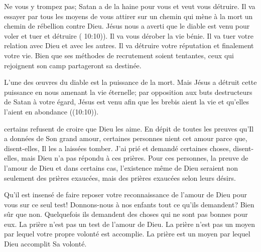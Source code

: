 
Ne vous y trompez pas; Satan a de la haine pour vous et veut vous détruire.
 Il va essayer par tous les moyens de vous attirer sur un chemin
 qui mène à la mort \ocadr un chemin de rébellion contre Dieu.
 Jésus nous a averti que le diable est venu pour
 \og voler et tuer et détruire \fg{} ( 10:10)).
 Il va vous dérober la vie bénie. Il va tuer votre relation avec Dieu
 et avec les autres. Il va détruire votre réputation et finalement votre vie.
 Bien que ses méthodes de recrutement soient tentantes,
 ceux qui rejoignent son camp partageront sa destinée. 

L'une des œuvres du diable est la puissance de la mort.
 Mais Jésus a détruit cette puissance en nous amenant la vie éternelle; 
 par opposition aux buts destructeurs de Satan à votre égard,
 Jésus est venu \og afin que les brebis aient la vie
 et qu'elles l'aient en abondance \fg{} ((10:10)). 

\dvrule






 certains refusent de croire que Dieu les aime.
 En dépit de toutes les preuves qu'Il a données de Son grand amour,
 certaines personnes nient cet amour parce que, disent-elles,
 Il les a laissées tomber.
 \og J'ai prié et demandé certaines choses, disent-elles, 
 mais Dieu n'a pas répondu à ces prières. \fg{}
 Pour ces personnes, la preuve de l'amour de Dieu
 \ocadr et dans certains cas, l'existence même de Dieu \fcadr{}
 seraient non seulement des prières exaucées,
 mais des prières exaucées selon leurs désirs. 

Qu'il est insensé de faire reposer votre reconnaissance de l'amour de Dieu
 pour vous sur ce seul test!
 Donnons-nous à nos enfants tout ce qu'ils demandent? Bien sûr que non.
 Quelquefois ils demandent des choses qui ne sont pas bonnes pour eux.
 La prière n'est pas un test de l'amour de Dieu.
 La prière n'est pas un moyen par lequel votre propre volonté est accomplie.
 La prière est un moyen par lequel Dieu accomplit Sa volonté. 

